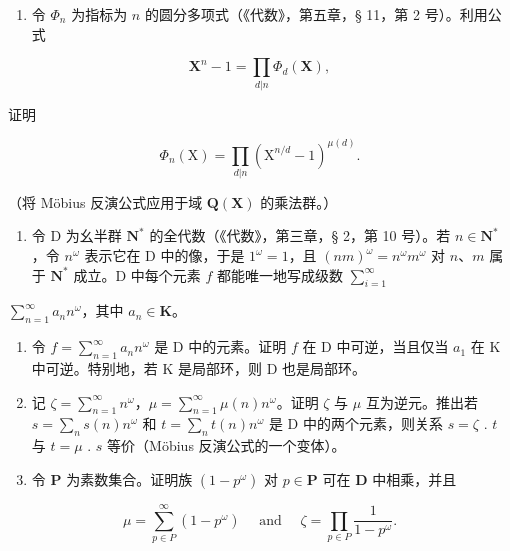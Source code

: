 \exercisesforappendix

\begin{enumerate}
\def\labelenumi{\arabic{enumi}.}
\tightlist
\item
  令 \(\Phi_n\) 为指标为 \(n\) 的圆分多项式（《代数》，第五章，§ 11，第 2 号）。利用公式
\end{enumerate}

\[
\mathbf {X} ^ {n} - 1 = \prod_ {d | n} \Phi_ {d} (\mathbf {X}),
\]

证明

\[
\Phi_ {n} (\mathrm{X}) = \prod_ {d | n} \left(\mathrm{X} ^ {n / d} - 1\right) ^ {\mu (d)}.
\]

（将 Möbius 反演公式应用于域 \(\mathbf{Q}(\mathbf{X})\) 的乘法群。）

\begin{enumerate}
\def\labelenumi{\arabic{enumi}.}
\setcounter{enumi}{1}
\tightlist
\item
  令 D 为幺半群 \(\mathbf{N}^*\) 的全代数（《代数》，第三章，§ 2，第 10 号）。若 \(n \in \mathbf{N}^*\)，令 \(n^\omega\) 表示它在 D 中的像，于是 \(1^\omega = 1\)，且 \((nm)^\omega = n^\omega m^\omega\) 对 \(n\)、\(m\) 属于 \(\mathbf{N}^*\) 成立。D 中每个元素 \(f\) 都能唯一地写成级数 \(\sum_{i=1}^{\infty}\)
\end{enumerate}

\(\sum_{n=1}^{\infty} a_n n^\omega\)，其中 \(a_n \in \mathbf{K}\)。

\begin{enumerate}
\def\labelenumi{(\alph{enumi})}
\item
  令 \(f = \sum_{n=1}^{\infty} a_n n^\omega\) 是 D 中的元素。证明 \(f\) 在 D 中可逆，当且仅当 \(a_1\) 在 K 中可逆。特别地，若 K 是局部环，则 D 也是局部环。
\item
  记 \(\zeta = \sum_{n=1}^{\infty} n^{\omega}\)，\(\mu = \sum_{n=1}^{\infty} \mu(n)n^{\omega}\)。证明 \(\zeta\) 与 \(\mu\) 互为逆元。推出若 \(s = \sum_{n} s(n)n^{\omega}\) 和 \(t = \sum_{n} t(n)n^{\omega}\) 是 D 中的两个元素，则关系 \(s = \zeta\) . \(t\) 与 \(t = \mu\) . \(s\) 等价（Möbius 反演公式的一个变体）。
\item
  令 \(\mathbf{P}\) 为素数集合。证明族 \((1 - p^{\omega})\) 对 \(p\in \mathbf{P}\) 可在 \(\mathbf{D}\) 中相乘，并且
\end{enumerate}

\[
\mu = \sum_ {p \in P} ^ {\infty} (1 - p ^ {\omega}) \quad \text { and } \quad \zeta = \prod_ {p \in P} \frac {1}{1 - p ^ {\omega}}.
\]


